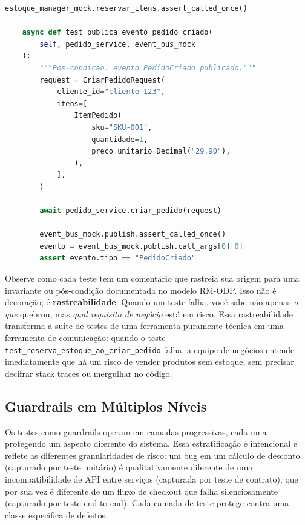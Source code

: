 \begin{lstlisting}[language=Python, caption={Testes derivados das vistas do RM-ODP}]
        estoque_manager_mock.reservar_itens.assert_called_once()

    async def test_publica_evento_pedido_criado(
        self, pedido_service, event_bus_mock
    ):
        """Pos-condicao: evento PedidoCriado publicado."""
        request = CriarPedidoRequest(
            cliente_id="cliente-123",
            itens=[
                ItemPedido(
                    sku="SKU-001",
                    quantidade=1,
                    preco_unitario=Decimal("29.90"),
                ),
            ],
        )

        await pedido_service.criar_pedido(request)

        event_bus_mock.publish.assert_called_once()
        evento = event_bus_mock.publish.call_args[0][0]
        assert evento.tipo == "PedidoCriado"
\end{lstlisting}

Observe como cada teste tem um comentário que rastreia sua origem para uma
invariante ou pós-condição documentada no modelo RM-ODP. Isso não é decoração;
é \textbf{rastreabilidade}. Quando um teste falha, você sabe não apenas
\emph{o que} quebrou, mas \emph{qual requisito de negócio} está em risco. Essa
rastreabilidade transforma a suíte de testes de uma ferramenta puramente técnica
em uma ferramenta de comunicação: quando o teste
\texttt{test\_reserva\_estoque\_ao\_criar\_pedido} falha, a equipe de negócios
entende imediatamente que há um risco de vender produtos sem estoque, sem
precisar decifrar stack traces ou mergulhar no código.

\subsection{Guardrails em Múltiplos Níveis}

Os testes como guardrails operam em camadas progressivas, cada uma protegendo
um aspecto diferente do sistema. Essa estratificação é intencional e reflete
as diferentes granularidades de risco: um bug em um cálculo de desconto
(capturado por teste unitário) é qualitativamente diferente de uma
incompatibilidade de API entre serviços (capturada por teste de contrato),
que por sua vez é diferente de um fluxo de checkout que falha silenciosamente
(capturado por teste end-to-end). Cada camada de teste protege contra uma
classe específica de defeitos.

